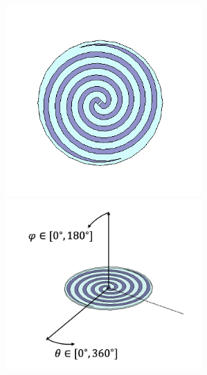 \documentclass[11pt,a4paper,uplatex]{ujarticle}
\begin{document}
  \begin{figure}[tbp]
    \begin{minipage}[b]{0.495\textwidth}
      \centering
      \includegraphics[keepaspectratio, width=75mm]{Images/spiral_antenna_configuration.png}
    \end{minipage}
    \begin{minipage}[b]{0.495\textwidth}
      \centering
      \includegraphics[keepaspectratio, width=75mm]{Images/spiral_withcord.png}
    \end{minipage}
  \end{figure}
\end{document}
